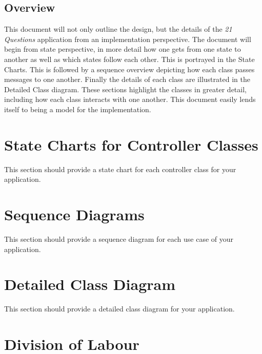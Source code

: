 \documentclass[]{article}
\begin{document}

\subsection{Overview}
\label{sub:overview}


This document will not only outline the design, but the details of the \textit{21 Questions} application from an implementation perspective. The document will begin from state perspective, in more detail how one gets from one state to another as well as which states follow each other. This is portrayed in the State Charts. This is followed by a sequence overview depicting how each class passes messages to one another. Finally the details of each class are 
illustrated in the Detailed Class diagram. These sections highlight the classes in greater detail, including how each class interacts with one another. This document easily lends itself to being a model for the implementation.



\section{State Charts for Controller Classes}
\label{sec:state_charts_for_controller_classes}
This section should provide a state chart for each controller class for your application.

\section{Sequence Diagrams}
\label{sec:sequence_diagrams}
This section should provide a sequence diagram for each use case of your application.

\section{Detailed Class Diagram}
\label{sec:detailed_class_diagram}
This section should provide a detailed class diagram for your application.

\appendix
\section{Division of Labour}
\label{sec:division_of_labour}
\end{document}
